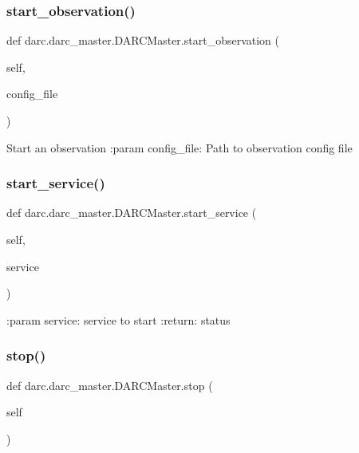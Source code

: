 \subsubsection{\texorpdfstring{start\_observation()}{start\_observation()}}
{\footnotesize\ttfamily def darc.\+darc\+\_\+master.\+D\+A\+R\+C\+Master.\+start\+\_\+observation (\begin{DoxyParamCaption}\item[{}]{self,  }\item[{}]{config\+\_\+file }\end{DoxyParamCaption})}

\begin{DoxyVerb}Start an observation
:param config_file: Path to observation config file
\end{DoxyVerb}
 \mbox{\label{classdarc_1_1darc__master_1_1_d_a_r_c_master_a0cfd8f4e4fc33e681564c2769bd8e362}} 
\subsubsection{\texorpdfstring{start\_service()}{start\_service()}}
{\footnotesize\ttfamily def darc.\+darc\+\_\+master.\+D\+A\+R\+C\+Master.\+start\+\_\+service (\begin{DoxyParamCaption}\item[{}]{self,  }\item[{}]{service }\end{DoxyParamCaption})}

\begin{DoxyVerb}:param service: service to start
:return: status
\end{DoxyVerb}
 \mbox{\label{classdarc_1_1darc__master_1_1_d_a_r_c_master_ab9838f3edc02ea5baf103b426ba906c3}} 
\subsubsection{\texorpdfstring{stop()}{stop()}}
{\footnotesize\ttfamily def darc.\+darc\+\_\+master.\+D\+A\+R\+C\+Master.\+stop (\begin{DoxyParamCaption}\item[{}]{self }\end{DoxyParamCaption})}

